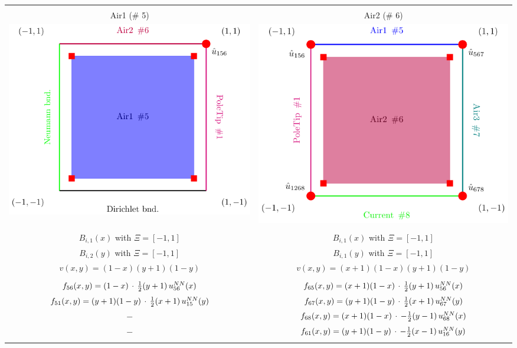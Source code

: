 \documentclass[12pt]{article}
\begin{document}
	\newpage
\begin{tabular}{c|c}
		\hline \hline \\[-1.25ex]
		Air1 (\# 5) & Air2 (\# 6) \\
		\hline
		\includegraphics[width=0.5 \linewidth]{./standalones/Air1.pdf} &		 
		\includegraphics[width=0.5 \linewidth]{./standalones/Air2.pdf}
		\\
		\hline \\[-0.75ex]
		$B_{i,1}(x)$ with $\Xi = \left[-1,1\right]$ 
		& 
		$B_{i,1}(x)$ with $\Xi = \left[-1,1\right]$
		\\ [0.75ex]
		$B_{i,2}(y)$ with $\Xi = \left[-1,1\right]$
		& 
		$B_{i,1}(y)$ with $\Xi = \left[-1,1\right]$
		\\ [0.75ex]
		$v(x,y)=(1-x)(y+1)(1-y)$ 
		&
		$v(x,y)=(x+1)(1-x)(y+1)(1-y)$
		\\ [0.75ex]
		\hline
		\\ [-0.75ex]
		$f_{56}(x,y)= (1-x) \, \cdot \, \frac{1}{2}(y+1) \,u^{\tiny NN}_{56}(x)$ 
		&
		$f_{65}(x,y)= (x+1)(1-x) \, \cdot \, \frac{1}{2}(y+1) \,u^{\tiny NN}_{56}(x)$ 
		\\
		$f_{51}(x,y)= (y+1)(1-y) \, \cdot \, \frac{1}{2}(x+1) \,u^{\tiny NN}_{15}(y)$ 
		&
		$f_{67}(x,y)= (y+1)(1-y) \, \cdot \, \frac{1}{2}(x+1) \,u^{\tiny NN}_{67}(y)$ 
		\\
		$-$ 
		&
		$f_{68}(x,y)= (x+1)(1-x) \, \cdot \, -\frac{1}{2}(y-1)\,u^{\tiny NN}_{68}(x)$ 
		\\
		$-$ 
		&
		$f_{61}(x,y)= (y+1)(1-y) \, \cdot \, -\frac{1}{2}(x-1)\,u^{\tiny NN}_{16}(y)$ 
		\\ [0.75ex]
		\hline 
		\\ [-0.75ex]
		

\end{tabular}
\end{document}
